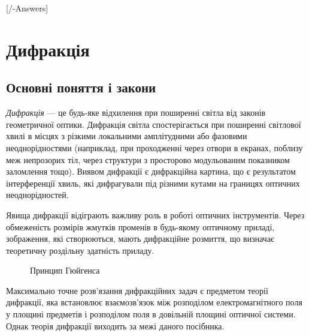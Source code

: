 
[\currfilebase/\currfilebase-Answers]
\chapter{Дифракція}\label{\currfilebase}
\makeatletter
{}
\makeatother




\section{Основні поняття і закони}


\emph{Дифракція} --- це будь-яке відхилення при поширенні світла від законів геометричної оптики. Дифракція світла спостерігається при поширенні світлової хвилі в місцях з різкими локальними амплітудними або фазовими неоднорідностями (наприклад, при проходженні через отвори в екранах, поблизу меж непрозорих тіл, через структури з просторово модульованим показником заломлення тощо). Виявом дифракції є дифракційна картина, що є результатом інтерференції хвиль, які дифрагували під різними кутами на границях оптичних неоднорідностей.

Явища дифракції відіграють важливу роль в роботі оптичних інструментів. Через обмеженість розмірів жмутків променів в будь-якому оптичному приладі, зображення, які створюються, мають дифракційне розмиття, що визначає теоретичну роздільну здатність приладу.

\begin{wrapfigure}{O}{0.5\linewidth}\centering
    
\caption{Принцип Гюйгенса}
\label{pic:Hughens_principle}
\end{wrapfigure}
Максимально точне розв’язання дифракційних задач є предметом теорії дифракції, яка встановлює взаємозв'язок між розподілом електромагнітного поля у площині предметів і розподілом поля в довільній площині оптичної системи. Однак теорія дифракції виходить за межі даного посібника.

